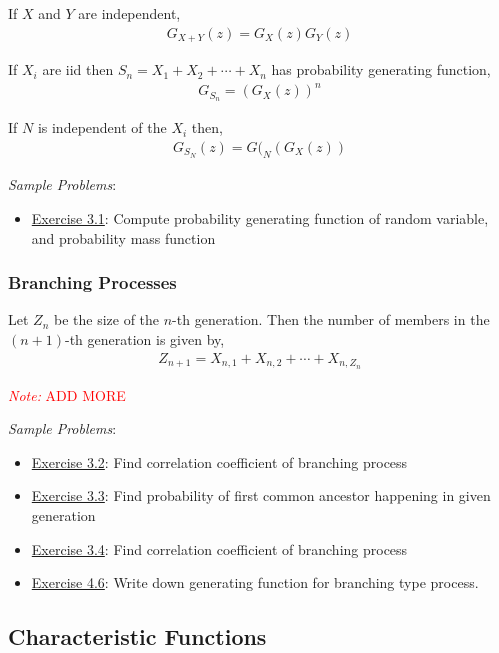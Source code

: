 \documentclass[12pt]{article}
\newcommand{\note}[1]{\textcolor{red}{\textit{Note:} #1}}
\begin{document}
If \( X \) and \( Y \) are independent,
\begin{align*}
    G_{X+Y}(z) = G_X(z)G_Y(z)
\end{align*}

If \( X_i \) are iid then \( S_n = X_1 +X_2 + \cdots +X_n \) has probability generating function,
\begin{align*}
    G_{S_n} = (G_X(z))^n
\end{align*}

If \( N \) is independent of the \( X_i \) then,
\begin{align*}
    G_{S_N}(z) = G(_N(G_X(z))
\end{align*}

\textit{Sample Problems}:
\begin{itemize}[nolistsep]
    \item \hyperref[Exercise 3.1]{Exercise 3.1}: Compute probability generating function of random variable, and probability mass function
\end{itemize}

\subsubsection{Branching Processes}

Let \( Z_n \) be the size of the \( n \)-th generation. Then the number of members in the \( (n+1) \)-th generation is given by,
\begin{align*}
    Z_{n+1} = X_{n,1} + X_{n,2} + \cdots + X_{n,Z_n}
\end{align*}


\note{ADD MORE}



\textit{Sample Problems}:
\begin{itemize}[nolistsep]
    \item \hyperref[Exercise 3.2]{Exercise 3.2}: Find correlation coefficient of branching process
    \item \hyperref[Exercise 3.3]{Exercise 3.3}: Find probability of first common ancestor happening in given generation
    \item \hyperref[Exercise 3.4]{Exercise 3.4}: Find correlation coefficient of branching process
    \item \hyperref[Exercise 4.6]{Exercise 4.6}: Write down generating function for branching type process.
\end{itemize}


\subsection{Characteristic Functions}
\end{document}
